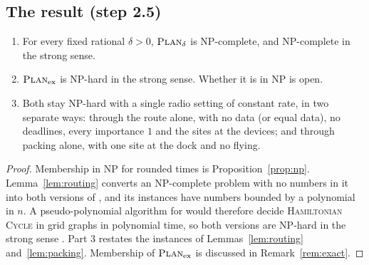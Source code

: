 \subsection{The result (step 2.5)}
\label{sec:t1-result}

\begin{theorem}[T1]
\label{thm:t1}
\begin{enumerate}
  \item For every fixed rational $\delta>0$, $\textsc{Plan}_\delta$ is NP-complete,
    and NP-complete in the strong sense.
  \item $\textsc{Plan}_{\mathrm{ex}}$ is NP-hard in the strong sense. Whether it is
    in NP is open.
  \item Both stay NP-hard with a single radio setting of constant rate, in
    two separate ways: through the route alone, with no data (or equal
    data), no deadlines, every importance $1$ and the sites at the devices;
    and through packing alone, with one site at the dock and no flying.
\end{enumerate}
\end{theorem}

\begin{proof}
Membership in NP for rounded times is Proposition~\ref{prop:np}.
Lemma~\ref{lem:routing} converts an NP-complete problem with no numbers in
it into both versions of \PLAN{}, and its instances have numbers bounded by
a polynomial in $n$. A pseudo-polynomial algorithm for \PLAN{} would
therefore decide \textsc{Hamiltonian Cycle} in grid graphs in polynomial
time, so both versions are NP-hard in the strong sense
\cite[Section~4.2]{GareyJohnson1979}. Part 3 restates the instances of
Lemmas~\ref{lem:routing} and~\ref{lem:packing}. Membership of
$\textsc{Plan}_{\mathrm{ex}}$ is discussed in Remark~\ref{rem:exact}.
\end{proof}

